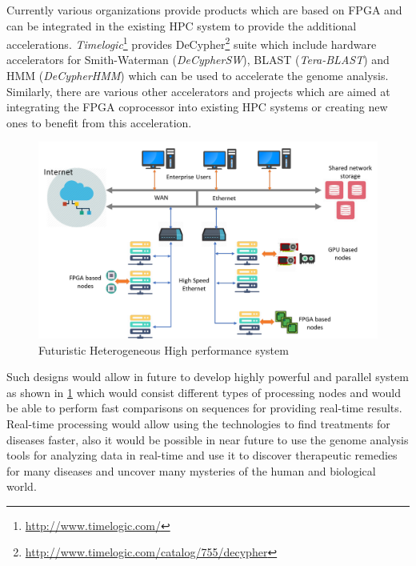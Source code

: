 \documentclass[12pt,twoside]{article}
\begin{document}
Currently various organizations provide products which are based on FPGA and can be integrated in the existing HPC system to provide the additional accelerations.
\emph{Timelogic}\footnote{\url{http://www.timelogic.com/}} provides DeCypher\footnote{\url{http://www.timelogic.com/catalog/755/decypher}} suite which include
hardware accelerators for Smith-Waterman (\emph{DeCypherSW\texttrademark}), BLAST (\emph{Tera-BLAST\texttrademark}) and HMM (\emph{DeCypherHMM\texttrademark})
which can be used to accelerate the genome analysis. Similarly, there are various other accelerators and projects which are aimed at integrating the FPGA coprocessor
into existing HPC systems or creating new ones to benefit from this acceleration.

\begin{figure}[h]%
    \centering
    \includegraphics[width=1.0\textwidth]{fig/heterosystem}
    \caption{Futuristic Heterogeneous High performance system}
    \label{fig:futuresys}
\end{figure}

Such designs would allow in future to develop highly powerful and parallel system as shown in \cref{fig:futuresys}
which would consist different types of processing nodes and would be able to perform fast comparisons on sequences
for providing real-time results. Real-time processing would allow using the technologies to find treatments for diseases
faster, also it would be possible in near future to use the genome analysis tools for analyzing data in real-time and use it to
discover therapeutic remedies for many diseases and uncover many mysteries of the human and biological world. 


\printbibliography
\end{document}
